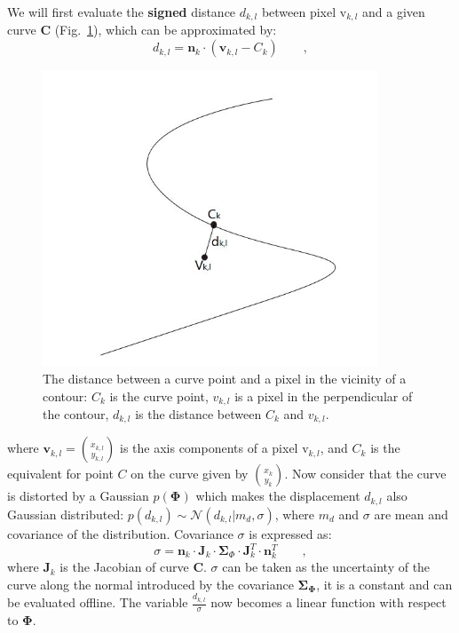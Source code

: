 We will first evaluate the \textbf{signed} distance $d_{k,l}$ between pixel
$\mathrm{v}_{k,l}$ and a given curve $\mathbf{C}$
(Fig.~\ref{fig:dis}), which
can be approximated by:
\begin{equation}
  \label{eq:dis}
  d_{k,l} = \mathbf{n}_k \cdot ( \mathbf{v}_{k,l} - C_k)\qquad,
\end{equation}

\begin{figure}[htbp]
  \centering
  \includegraphics[width=10cm]{images/dis.jpg}
  \caption[The distance between a curve point and a pixel in the vicinity
  of a contour]{The distance between a curve point and a pixel in the
    vicinity of a contour: $C_k$ is the curve point, $v_{k,l}$ is a
    pixel in the perpendicular of the contour, $d_{k,l}$ is the
    distance between $C_k$ and $v_{k,l}$.}
  \label{fig:dis}
\end{figure}

where $\mathbf{v}_{k,l} = {x_{k,l} \choose y_{k,l}}$ is the axis
components of a pixel
$\mathrm{v}_{k,l}$, and $C_k$ is the equivalent for point $C$ on the
curve given by ${x_k \choose y_k}$. Now consider that the curve is
distorted by a Gaussian $p(\mathbf{\Phi})$ which makes the displacement $d_{k,l}$ also Gaussian distributed: $p(d_{k,l}) \sim
\mathcal{N}(d_{k,l}|m_d, \sigma)$, where $m_d$ and $\sigma$ are mean
and covariance of the distribution. Covariance $\sigma$ is expressed as:
\begin{equation}
  \label{eq:cov}
  \sigma = \mathbf{n}_k \cdot \mathbf{J}_k \cdot \mathbf{\Sigma}_{\Phi}
  \cdot \mathbf{J}_k^T \cdot \mathbf{n}_k^T\qquad,
\end{equation}
where $\mathbf{J}_k$ is the Jacobian of curve $\mathbf{C}$. $\sigma$
can be taken as the uncertainty of the curve along the normal
introduced by the covariance
$\mathbf{\Sigma}_{\mathbf{\Phi}}$, it is a constant and can be
evaluated offline. The variable
$\frac{d_{k,l}}{\sigma}$ now becomes a linear function with respect to $\mathbf{\Phi}$.

